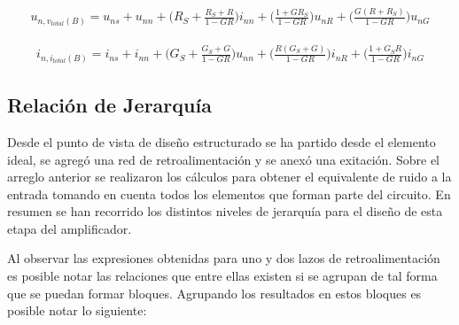 \documentclass[10pt,twocolumn,twoside,letterpaper]{IEEEtran}
\begin{document}
{\begin{figure*}[!t]
\begin{footnotesize}\begin{equation}
\begin{split}
u_{n,v_{total}(B)}=u_{ns}+u_{nn}+\biggl(R_S+\frac{R_S+R}{1-GR}\biggr)i_{nn}+\biggl(\frac{1+GR_S}{1-GR}\biggr)u_{nR}+\biggl(\frac{G(R+R_S)}{1-GR}\biggr)u_{nG}
\end{split}
\end{equation}\end{footnotesize}
\vspace{-0.5mm}
\begin{footnotesize}\begin{equation}
\begin{split}
i_{n,i_{total}(B)}=i_{ns}+i_{nn}+\biggl(G_S+\frac{G_S+G}{1-GR}\biggr)u_{nn}+\biggl(\frac{R(G_S+G)}{1-GR}\biggr)i_{nR}+\biggl(\frac{1+G_SR}{1-GR}\biggr)i_{nG}
\end{split}
\end{equation}\end{footnotesize}
\hrulefill
\end{figure*}


\subsection{\textbf{Relaci\'on de Jerarqu\'ia}}
\label{sec:hierarchy}  Desde el punto de vista de dise\~no estructurado se ha partido desde el elemento ideal, se agreg\'o una red de retroalimentaci\'on y se anex\'o una exitaci\'on. Sobre el arreglo anterior se realizaron los c\'alculos para obtener el equivalente de ruido a la entrada tomando en cuenta todos los elementos que forman parte del circuito. En resumen se han recorrido los distintos niveles de jerarqu\'ia para el dise\~no de esta etapa del amplificador.

Al observar las expresiones obtenidas para uno y dos lazos de retroalimentaci\'on es posible notar las relaciones que entre ellas existen si se agrupan de tal forma que se puedan formar bloques. Agrupando los resultados en estos bloques es posible notar lo siguiente:

}
\end{document}
